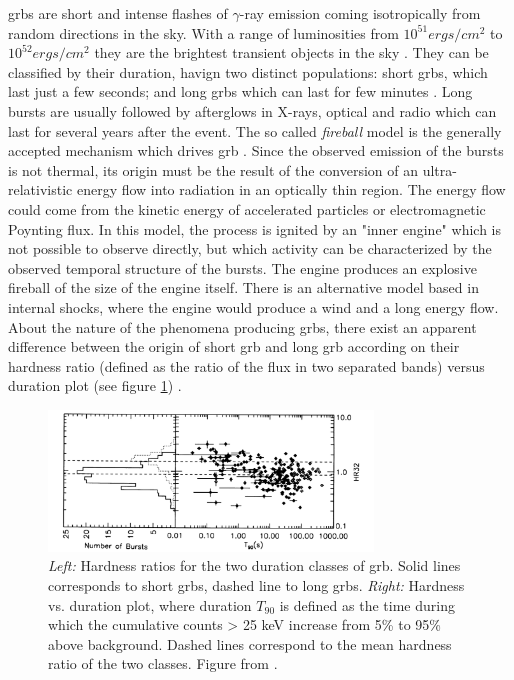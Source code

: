 \documentclass[main.tex]{subfiles}
\begin{document}
\glspl{grb} are short and intense flashes of $\gamma$-ray emission coming isotropically from random directions in the sky. With a range of luminosities from $10^{51} ergs/cm^2$ to $10^{52} ergs/cm^2$ they are the brightest transient objects in the sky \cite{2004GRB}. They can be classified by their duration, havign two distinct populations: short \glspl{grb}, which last just a few seconds; and long \glspl{grb} which can last for few minutes \cite{1993GRB2pop}. Long bursts are usually followed by afterglows in X-rays, optical and radio which can last for several years after the event.
The so called \textit{fireball} model is the generally accepted mechanism which drives \gls{grb} \cite{1999GRBfireball}. Since the observed emission of the bursts is not thermal, its origin must be the result of the conversion of an ultra-relativistic  energy flow into radiation in an optically thin region. The energy flow could come from the kinetic energy of accelerated particles or electromagnetic Poynting flux. In this model, the process is ignited by an "inner engine" which is not possible to observe directly, but which activity can be characterized by the observed temporal structure of the bursts. The engine produces an explosive fireball of the size of the engine itself. There is an alternative model based in internal shocks, where the engine would produce a wind and a long energy flow. About the nature of the phenomena producing \glspl{grb}, there exist an apparent difference between the origin of short \gls{grb} and long \gls{grb} according on their hardness ratio (defined as the ratio of the flux in two separated bands) versus duration plot (see figure \ref{fig:GRB2classes}) \cite{1993GRB2pop}.\\

\begin{figure}
\centering
 \includegraphics[width=0.77\textwidth]{Pictures/GRBhardnessdurationplot.pdf}
  \caption{\textit{Left:} Hardness ratios for the two duration classes of \gls{grb}. Solid lines corresponds to short \glspl{grb}, dashed line to long \glspl{grb}. \textit{Right:} Hardness vs. duration plot, where duration $T_{90}$ is defined as the time during which the cumulative counts > 25 keV increase from 5\% to 95\% above background. Dashed lines correspond to the mean hardness ratio of the two classes. Figure from \cite{1993GRB2pop}.}
    \label{fig:GRB2classes}
\end{figure}
\end{document}
